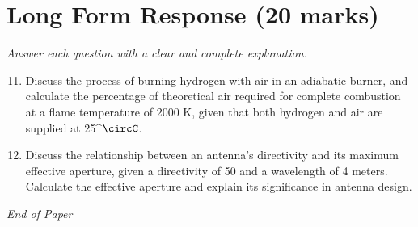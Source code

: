 \documentclass[12pt]{article}
\begin{document}
\section*{Long Form Response (20 marks)}
\textit{Answer each question with a clear and complete explanation.}
\begin{enumerate}[label=\arabic*.]
\setcounter{enumi}{10}
\item Discuss the process of burning hydrogen with air in an adiabatic burner, and calculate the percentage of theoretical air required for complete combustion at a flame temperature of 2000 K, given that both hydrogen and air are supplied at 25^\ensuremath{\circC}.
\item Discuss the relationship between an antenna's directivity and its maximum effective aperture, given a directivity of 50 and a wavelength of 4 meters. Calculate the effective aperture and explain its significance in antenna design.
\end{enumerate}

\vfill
\noindent\textit{End of Paper}
\end{document}
